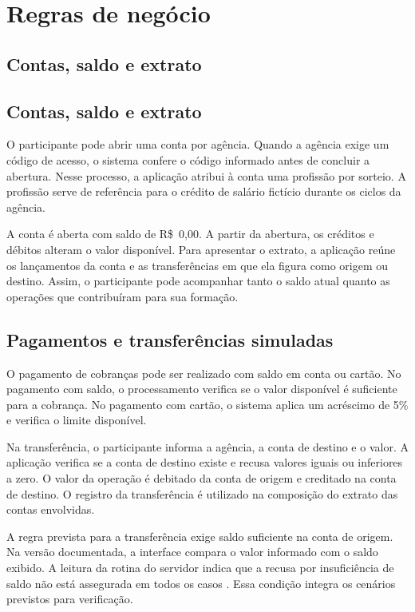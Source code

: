\section{Regras de negócio}
\label{cap-concepcao-regras}

\subsection{Contas, saldo e extrato}
\label{cap-concepcao-contas}

\subsection{Contas, saldo e extrato}

O participante pode abrir uma conta por agência. Quando a agência
exige um código de acesso, o sistema confere o código informado
antes de concluir a abertura. Nesse processo, a aplicação atribui
à conta uma profissão por sorteio. A profissão serve de referência
para o crédito de salário fictício durante os ciclos da agência.

A conta é aberta com saldo de \mbox{R\$~0,00}. A partir da abertura,
os créditos e débitos alteram o valor disponível. Para apresentar
o extrato, a aplicação reúne os lançamentos da conta e as
transferências em que ela figura como origem ou destino. Assim,
o participante pode acompanhar tanto o saldo atual quanto as
operações que contribuíram para sua formação.

\subsection{Pagamentos e transferências simuladas}
\label{cap-concepcao-pagamentos}

O pagamento de cobranças pode ser realizado com saldo em conta ou
cartão. No pagamento com saldo, o processamento verifica se o valor
disponível é suficiente para a cobrança. No pagamento com cartão,
o sistema aplica um acréscimo de 5\% e verifica o limite disponível.

Na transferência, o participante informa a agência, a conta de
destino e o valor. A aplicação verifica se a conta de destino
existe e recusa valores iguais ou inferiores a zero. O valor da
operação é debitado da conta de origem e creditado na conta de
destino. O registro da transferência é utilizado na composição
do extrato das contas envolvidas.

A regra prevista para a transferência exige saldo suficiente na
conta de origem. Na versão documentada, a interface compara o valor
informado com o saldo exibido. A leitura da rotina do servidor
indica que a recusa por insuficiência de saldo não está assegurada
em todos os casos \cite{bravin2026edbank}. Essa condição integra
os cenários previstos para verificação.

